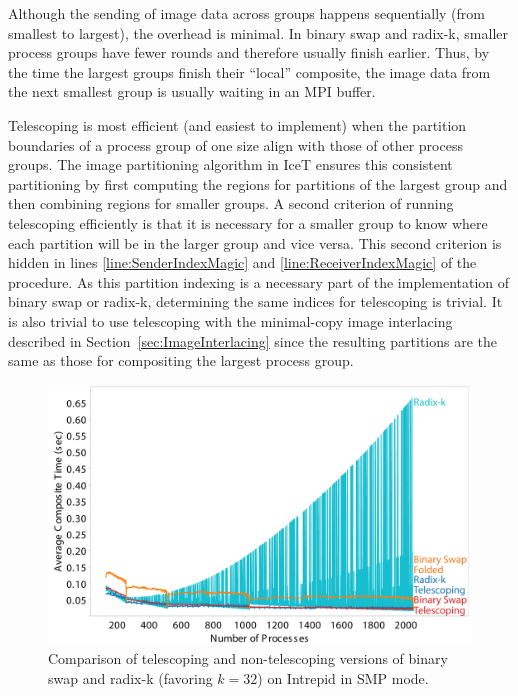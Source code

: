 \documentclass{sig-alternate}
\begin{document}
Although the sending of image data across groups happens sequentially (from
smallest to largest), the overhead is minimal.  In binary swap and radix-k,
smaller process groups have fewer rounds and therefore usually finish
earlier.  Thus, by the time the largest groups finish their ``local''
composite, the image data from the next smallest group is usually waiting
in an MPI buffer.

Telescoping is most efficient (and easiest to implement) when the partition
boundaries of a process group of one size align with those of other process
groups.  The image partitioning algorithm in IceT ensures this consistent
partitioning by first computing the regions for partitions of the largest
group and then combining regions for smaller groups.  A second criterion of
running telescoping efficiently is that it is necessary for a smaller group
to know where each partition will be in the larger group and vice versa.
This second criterion is hidden in lines \ref{line:SenderIndexMagic} and
\ref{line:ReceiverIndexMagic} of the  procedure.
As this partition indexing is a necessary part of the implementation of
binary swap or radix-k, determining the same indices for telescoping is
trivial.  It is also trivial to use telescoping with the minimal-copy image
interlacing described in Section~\ref{sec:ImageInterlacing} since the
resulting partitions are the same as those for compositing the largest
process group.

\begin{figure}[tbp]
  \centering
  \includegraphics[width=\linewidth]{images/TelescopeCompositeIntrepidSMP}
  \caption{Comparison of telescoping and non-telescoping versions of binary
    swap and radix-k (favoring $k=32$) on Intrepid in SMP mode.}
  \label{fig:TelescopeCompositeIntrepidSMP}
\end{figure}
\end{document}
